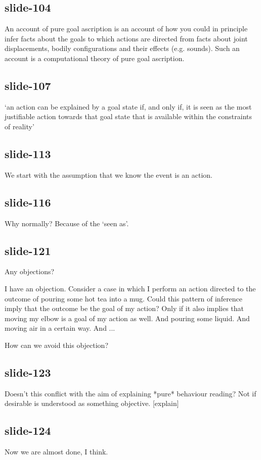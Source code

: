 \documentclass[12pt,\papersize]{extarticle}
\begin{document}
\subsection{slide-104}
An account of pure goal ascription is an account of how you could
in principle infer facts about the goals to which actions are directed from
facts about joint displacements, bodily configurations and their effects
(e.g. sounds).
Such an account is a computational theory of pure goal ascription.

\subsection{slide-107}
‘an action can be explained by a goal state if, and only if, it is seen as  the  most justifiable action towards that goal state that is available within the constraints of reality’
\citep[p.~255]{Csibra:1998cx}

\subsection{slide-113}
We start with the assumption that we know the event is an action.

\subsection{slide-116}
Why normally? Because of the ‘seen as’.

\subsection{slide-121}
Any objections?

I have an objection.
Consider a case in which I perform an action directed to
the outcome of pouring some hot tea into a mug.
Could this pattern of inference imply that the outcome be the goal of my action?
Only if it also implies that moving my elbow is a goal of my action
as well.
And pouring some liquid.
And moving air in a certain way.
And ...

How can we avoid this objection?

\subsection{slide-123}
Doesn’t this conflict with the aim of explaining *pure* behaviour reading?
Not if desirable is understood as something objective.
[explain]

\subsection{slide-124}
Now we are almost done, I think.
\end{document}
